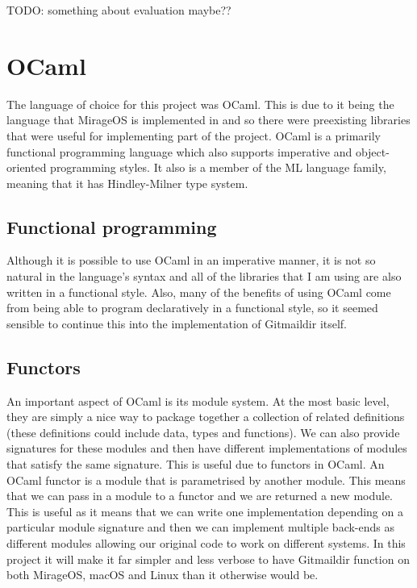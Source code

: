 TODO: something about evaluation maybe??

\section{OCaml}

The language of choice for this project was OCaml\cite{code_ocaml}. This is due to it being the language that MirageOS is implemented in and so there were preexisting libraries that were useful for implementing part of the project. OCaml is a primarily functional programming language which also supports imperative and object-oriented programming styles. It also is a member of the ML language family, meaning that it has Hindley-Milner type system.

\subsection{Functional programming}

Although it is possible to use OCaml in an imperative manner, it is not so natural in the language's syntax and all of the libraries that I am using are also written in a functional style. Also, many of the benefits of using OCaml come from being able to program declaratively in a functional style, so it seemed sensible to continue this into the implementation of Gitmaildir itself.

\subsection{Functors}

An important aspect of OCaml is its module system. At the most basic level, they are simply a nice way to package together a collection of related definitions (these definitions could include data, types and functions). We can also provide signatures for these modules and then have different implementations of modules that satisfy the same signature. This is useful due to functors in OCaml. An OCaml functor is a module that is parametrised by another module. This means that we can pass in a module to a functor and we are returned a new module. This is useful as it means that we can write one implementation depending on a particular module signature and then we can implement multiple back-ends as different modules allowing our original code to work on different systems. In this project it will make it far simpler and less verbose to have Gitmaildir function on both MirageOS, macOS and Linux than it otherwise would be.

